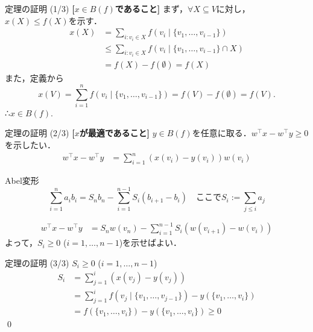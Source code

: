 \documentclass[14pt,aspectratio=169,xcolor=dvipsnames,table,onlytextwidth,dvipdfmx]{beamer}
\begin{document}
\begin{frame}{定理の証明 (1/3)}
    \small
    \textbf{[$x \in B(f)$であること]} まず，$\forall X \subseteq V$に対し，$x(X) \leq f(X)$を示す．
    \begin{align*}
        x(X) &= \sum_{i: v_i \in X} f(v_i \mid \{v_1, \dots, v_{i-1}\}) \\
        &\leq \sum_{i: v_i \in X} f(v_i \mid \{v_1, \dots, v_{i-1}\} \cap X) \\
        &= f(X) - f(\emptyset) = f(X)
    \end{align*}
    また，定義から
    \[
        x(V) = \sum_{i=1}^n f(v_i \mid \{v_1, \dots, v_{i-1}\}) = f(V) - f(\emptyset) = f(V). 
    \]
    ∴$x \in B(f)$.
\end{frame}

\begin{frame}{定理の証明 (2/3)}
    \small
    \textbf{[$x$が最適であること]} 
    $y \in B(f)$を任意に取る．$w^\top x - w^\top y \geq 0$を示したい．
    \begin{align*}
        w^\top x - w^\top y 
        &= \sum_{i=1}^n (x(v_i) - y(v_i)) w(v_i) 
    \end{align*}
    \pause
    \setlength{\abovedisplayskip}{0pt}
    {\footnotesize
    \begin{block}{Abel変形}
        \[
            \sum_{i=1}^n a_i b_i = S_n b_n - \sum_{i=1}^{n-1} S_i (b_{i+1} - b_i) \quad \text{ここで$S_i := \sum_{j \leq i} a_j$} 
        \] 
    \end{block}
    }
    \pause
    \begin{align*}
        w^\top x - w^\top y 
        &= S_n w(v_n) - \sum_{i=1}^{n-1} S_i (w(v_{i+1}) - w(v_i)) 
    \end{align*}
    よって，$S_i \geq 0$ ($i = 1, \dots, n-1$)を示せばよい．
\end{frame}

\begin{frame}{定理の証明 (3/3)}
    \small
     $S_i \geq 0$ ($i = 1, \dots, n-1$) \\[1em]
    \begin{align*}
        S_i &= \sum_{j=1}^i (x(v_j) - y(v_j)) \\
        &= \sum_{j=1}^i f(v_j \mid \{v_1, \dots, v_{j-1}\}) - y(\{v_1, \dots, v_i\}) \\
        &= f(\{v_1, \dots, v_i\}) - y(\{v_1, \dots, v_i\}) \geq 0 \tag{$y \in B(f)$}
    \end{align*}
    \qed
\end{frame}
\end{document}
